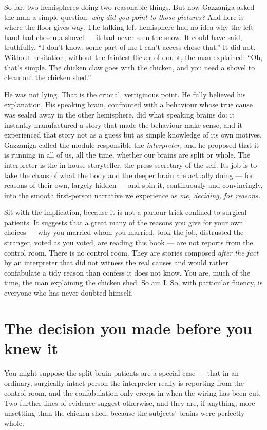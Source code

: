 So far, two hemispheres doing two reasonable things. But now Gazzaniga asked the man a simple question: \emph{why did you point to those pictures?} And here is where the floor gives way. The talking left hemisphere had no idea why the left hand had chosen a shovel — it had never seen the snow. It could have said, truthfully, ``I don't know; some part of me I can't access chose that.'' It did not. Without hesitation, without the faintest flicker of doubt, the man explained: ``Oh, that's simple. The chicken claw goes with the chicken, and you need a shovel to clean out the chicken shed.''

He was not lying. That is the crucial, vertiginous point. He fully believed his explanation. His speaking brain, confronted with a behaviour whose true cause was sealed away in the other hemisphere, did what speaking brains do: it instantly manufactured a story that made the behaviour make sense, and it experienced that story not as a guess but as simple knowledge of its own motives. Gazzaniga called the module responsible the \emph{interpreter,} and he proposed that it is running in all of us, all the time, whether our brains are split or whole. The interpreter is the in-house storyteller, the press secretary of the self. Its job is to take the chaos of what the body and the deeper brain are actually doing — for reasons of their own, largely hidden — and spin it, continuously and convincingly, into the smooth first-person narrative we experience as \emph{me, deciding, for reasons.}

Sit with the implication, because it is not a parlour trick confined to surgical patients. It suggests that a great many of the reasons you give for your own choices — why you married whom you married, took the job, distrusted the stranger, voted as you voted, are reading this book — are not reports from the control room. There is no control room. They are stories composed \emph{after the fact} by an interpreter that did not witness the real causes and would rather confabulate a tidy reason than confess it does not know. You are, much of the time, the man explaining the chicken shed. So am I. So, with particular fluency, is everyone who has never doubted himself.

\section*{The decision you made before you knew it}

You might suppose the split-brain patients are a special case — that in an ordinary, surgically intact person the interpreter really is reporting from the control room, and the confabulation only creeps in when the wiring has been cut. Two further lines of evidence suggest otherwise, and they are, if anything, more unsettling than the chicken shed, because the subjects' brains were perfectly whole.

